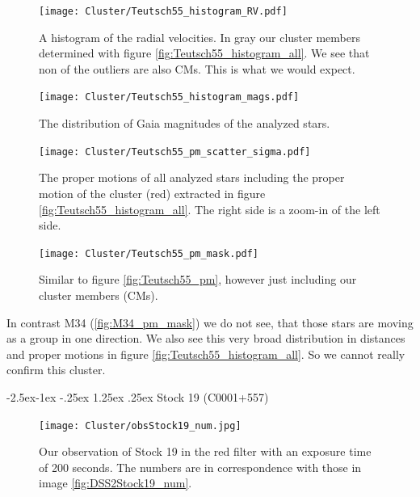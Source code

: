 \documentclass{article}
\makeatletter
\renewcommand\paragraph{\@startsection{paragraph}{4}{\z@}%
            {-2.5ex\@plus -1ex \@minus -.25ex}%
            {1.25ex \@plus .25ex}%
            {\normalfont\normalsize\bfseries}}
\makeatother
\begin{document}
\begin{figure}[H]
  \centering
    \texttt{[image: Cluster/Teutsch55\_histogram\_RV.pdf]}
  \caption{A histogram of the radial velocities. In gray our cluster members determined with figure \ref{fig:Teutsch55_histogram_all}. We see that non of the outliers are also CMs. This is what we would expect.}
  \label{fig:Teutsch55_histogram_RV}
\end{figure}

\begin{figure}[H]
  \centering
    \texttt{[image: Cluster/Teutsch55\_histogram\_mags.pdf]}
  \caption{The distribution of Gaia magnitudes of the analyzed stars.}
  \label{fig:Teutsch55_histogram_mags}
\end{figure}

\begin{figure}[H]
  \centering
    \texttt{[image: Cluster/Teutsch55\_pm\_scatter\_sigma.pdf]}
  \caption{The proper motions of all analyzed stars including the proper motion of the cluster (red) extracted in figure \ref{fig:Teutsch55_histogram_all}. The right side is a zoom-in of the left side.}
  \label{fig:Teutsch55_pm_scatter_sigma}
\end{figure}

\begin{figure}[H]
  \centering
    \texttt{[image: Cluster/Teutsch55\_pm\_mask.pdf]}
  \caption{Similar to figure \ref{fig:Teutsch55_pm}, however just including our cluster members (CMs).}
  \label{fig:Teutsch55_pm_mask}
\end{figure}

In contrast M34 (\ref{fig:M34_pm_mask}) we do not see, that those stars are moving as a group in one direction. We also see this very broad distribution in distances and proper motions in figure \ref{fig:Teutsch55_histogram_all}. So we cannot really confirm this cluster.

\paragraph{Stock 19 (C0001+557)}

\begin{figure}[H]
  \centering
    \texttt{[image: Cluster/obsStock19\_num.jpg]}
  \caption{Our observation of Stock 19 in the red filter with an exposure time of 200 seconds. The numbers are in correspondence with those in image \ref{fig:DSS2Stock19_num}.}
  \label{fig:obsStock19_num}
\end{figure}
\end{document}
